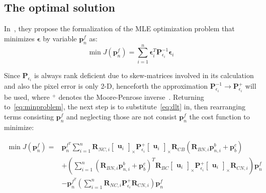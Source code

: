 \subsection{The optimal solution}

In~\cite{absolute-triangulation}, they propose the formalization of the MLE optimization problem that minimizes $\boldsymbol{\epsilon}$ by variable $\mathbf{p}_n^f$ as:
\begin{equation}
    \min J(\mathbf{p}_n^f)=\sum_{i=1}^n\boldsymbol{\epsilon}_i^T\mathbf{P}_{\epsilon_i}^{-1}\boldsymbol{\epsilon}_i
    \label{eq:minproblem}
\end{equation}

Since $\mathbf{P}_{\epsilon_i}$ is always rank deficient due to skew-matrices involved in its calculation and also the pixel error is only 2-D, henceforth the approximation $\mathbf{P}_{\epsilon_i}^{-1}\rightarrow\mathbf{P}_{\epsilon_i}^{+}$ will be used, where $^+$ denotes the Moore-Penrose inverse~\cite{moorepenrose}. Returning to~\eqref{eq:minproblem}, the next step is to substitute~\eqref{eq:dlt} in, then rearranging terms consisting $\mathbf{p}_n^f$ and neglecting those are not consist $\mathbf{p}_n^f$ the cost function to minimize:

\begin{equation}
\begin{aligned}
    \min J(\mathbf{p}_n^f) = & \mathbf{p}_n^{f^T}\sum_{i=1}^n \mathbf{R}_{NC, i}\begin{bmatrix}
        \mathbf{u}_i
    \end{bmatrix}_\times \mathbf{P}_{\epsilon_i}^{+} 
    \begin{bmatrix}
        \mathbf{u}_i
    \end{bmatrix}_\times
    \mathbf{R}_{CB}(\mathbf{R}_{BN, i}\mathbf{p}_{n, i}^b + \mathbf{p}_b^c) \\ &
     + \left(\sum_{i=1}^n{(\mathbf{R}_{BN, i}\mathbf{p}_{n, i}^b + \mathbf{p}_b^c)}^T\mathbf{R}_{BC}
    \begin{bmatrix}
        \mathbf{u}_i
    \end{bmatrix}_\times \mathbf{P}_{\epsilon_i}^{+}
    \begin{bmatrix}
        \mathbf{u}_i
    \end{bmatrix}_\times \mathbf{R}_{CN, i}\right) \mathbf{p}_n^f \\ &
    -\mathbf{p}_n^{f^T}\left( \sum_{i=1}^n \mathbf{R}_{NC, i}\mathbf{P}_{\epsilon_i}^{+}\mathbf{R}_{CN, i}\right)\mathbf{p}_n^f
\end{aligned}
\label{eq:costfunc}
\end{equation}

